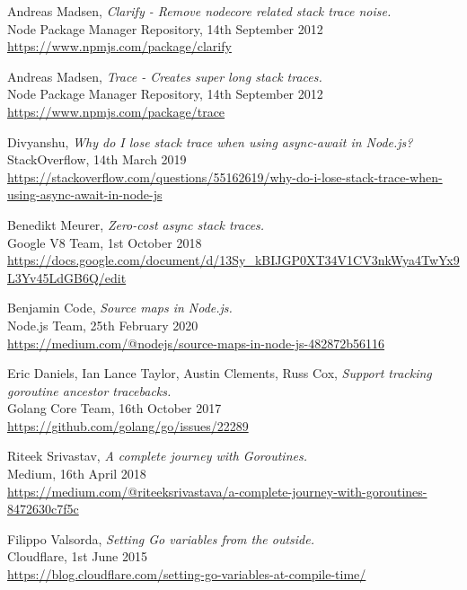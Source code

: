 \documentclass[12pt,pdftex,titlepage]{report}
\begin{document}
\begin{thebibliography}{69}
        Andreas Madsen, \textit{Clarify - Remove nodecore related stack trace noise.} \\
        Node Package Manager Repository, 14th September 2012 \\
        \url{https://www.npmjs.com/package/clarify}
        
        Andreas Madsen, \textit{Trace - Creates super long stack traces.} \\
        Node Package Manager Repository, 14th September 2012 \\
        \url{https://www.npmjs.com/package/trace}
        
        Divyanshu, \textit{Why do I lose stack trace when using async-await in Node.js?} \\
        StackOverflow, 14th March 2019 \\
        \url{https://stackoverflow.com/questions/55162619/why-do-i-lose-stack-trace-when-using-async-await-in-node-js}

        Benedikt Meurer, \textit{Zero-cost async stack traces.} \\
        Google V8 Team, 1st October 2018 \\
        \url{https://docs.google.com/document/d/13Sy_kBIJGP0XT34V1CV3nkWya4TwYx9L3Yv45LdGB6Q/edit}

        Benjamin Code, \textit{Source maps in Node.js.} \\
        Node.js Team, 25th February 2020 \\
        \url{https://medium.com/@nodejs/source-maps-in-node-js-482872b56116}

        Eric Daniels, Ian Lance Taylor, Austin Clements, Russ Cox, \textit{Support tracking goroutine ancestor tracebacks.} \\
        Golang Core Team, 16th October 2017 \\
        \url{https://github.com/golang/go/issues/22289}
        
        Riteek Srivastav, \textit{A complete journey with Goroutines.} \\
        Medium, 16th April 2018 \\
        \url{https://medium.com/@riteeksrivastava/a-complete-journey-with-goroutines-8472630c7f5c}

        Filippo Valsorda, \textit{Setting Go variables from the outside.} \\
        Cloudflare, 1st June 2015 \\
        \url{https://blog.cloudflare.com/setting-go-variables-at-compile-time/}

    \end{thebibliography}
\end{document}
